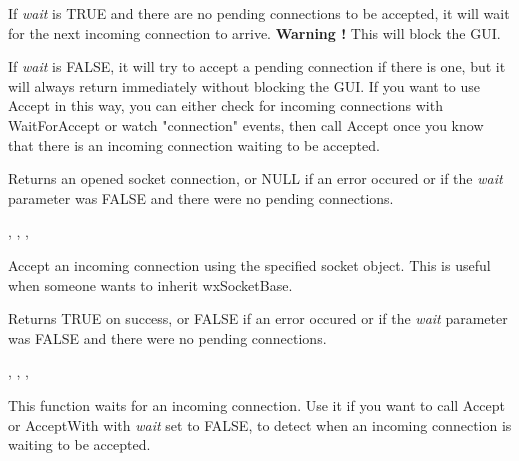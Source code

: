 If {\it wait} is TRUE and there are no pending connections to be
accepted, it will wait for the next incoming connection to arrive.
{\bf Warning !} This will block the GUI.

If {\it wait} is FALSE, it will try to accept a pending connection
if there is one, but it will always return immediately without
blocking the GUI. If you want to use Accept in this way, you can
either check for incoming connections with WaitForAccept or watch
"connection" events, then call Accept once you know that there is
an incoming connection waiting to be accepted.


Returns an opened socket connection, or NULL if an error occured or
if the {\it wait} parameter was FALSE and there were no pending
connections.


, 
, 
, 

%
%
\label{wxsocketserveracceptwith}


Accept an incoming connection using the specified socket object.
This is useful when someone wants to inherit wxSocketBase.




Returns TRUE on success, or FALSE if an error occured or if the
{\it wait} parameter was FALSE and there were no pending
connections.

, 
, 
, 

%
%
\label{wxsocketserverwaitforaccept}


This function waits for an incoming connection. Use it if you want to call
Accept or AcceptWith with {\it wait} set to FALSE, to detect when an incoming
connection is waiting to be accepted.

